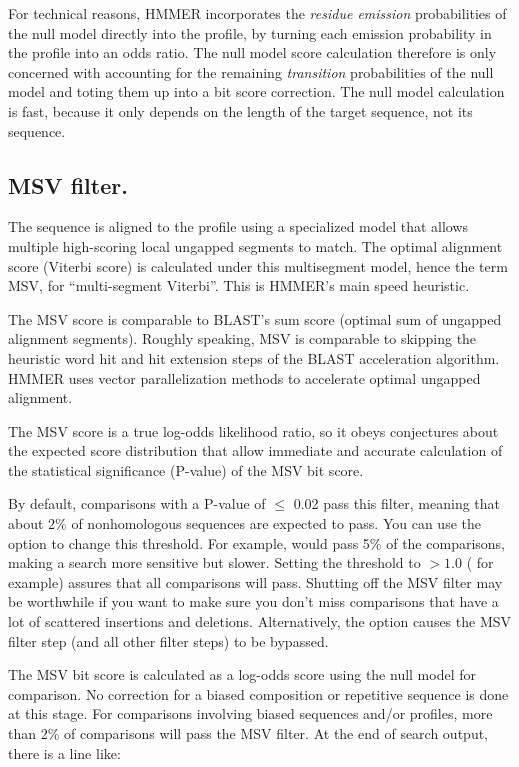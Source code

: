 For technical reasons, HMMER incorporates the \emph{residue emission}
probabilities of the null model directly into the profile, by turning
each emission probability in the profile into an odds ratio. The null
model score calculation therefore is only concerned with accounting
for the remaining \emph{transition} probabilities of the null model
and toting them up into a bit score correction.  The null model
calculation is fast, because it only depends on the length of the
target sequence, not its sequence.

\subsection{MSV filter.}

The sequence is aligned to the profile using a specialized model that
allows multiple high-scoring local ungapped segments to match.  The
optimal alignment score (Viterbi score) is calculated under this
multisegment model, hence the term MSV, for ``multi-segment
Viterbi''. This is HMMER's main speed heuristic.

The MSV score is comparable to BLAST's sum score (optimal sum of
ungapped alignment segments).  Roughly speaking, MSV is comparable to
skipping the heuristic word hit and hit extension steps of the BLAST
acceleration algorithm. HMMER uses vector parallelization methods to
accelerate optimal ungapped alignment.

The MSV score is a true log-odds likelihood ratio, so it obeys
conjectures about the expected score distribution \citep{Eddy08} that
allow immediate and accurate calculation of the statistical
significance (P-value) of the MSV bit score.

By default, comparisons with a P-value of $\leq$ 0.02 pass this
filter, meaning that about $2\%$ of nonhomologous sequences are
expected to pass. You can use the  option to change
this threshold. For example,  would pass 5\% of the
comparisons, making a search more sensitive but slower. Setting the
threshold to $>1.0$ ( for example) assures that all
comparisons will pass. Shutting off the MSV filter may be worthwhile
if you want to make sure you don't miss comparisons that have a lot of
scattered insertions and deletions. Alternatively, the 
option causes the MSV filter step (and all other filter steps) to be
bypassed.

The MSV bit score is calculated as a log-odds score using the null
model for comparison. No correction for a biased composition or
repetitive sequence is done at this stage. For comparisons involving
biased sequences and/or profiles, more than 2\% of comparisons will
pass the MSV filter. At the end of search output, there is a line
like:

